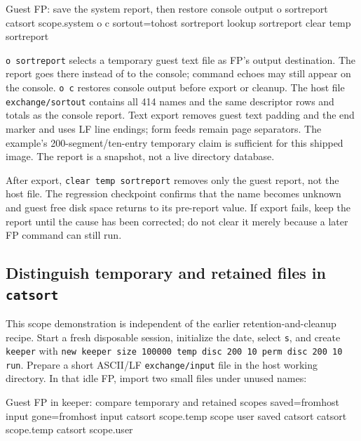 \begin{commandexample}{Guest FP: save the system report, then restore console output}
o sortreport
catsort scope.system
o c
sortout=tohost sortreport
lookup sortreport
clear temp sortreport
\end{commandexample}

\passthrough{\lstinline!o sortreport!} selects a temporary guest text file as FP's output destination. The report goes there instead of to the console; command echoes may still appear on the console. \passthrough{\lstinline!o c!} restores console output before export or cleanup. The host file \passthrough{\lstinline!exchange/sortout!} contains all 414 names and the same descriptor rows and totals as the console report. Text export removes guest text padding and the end marker and uses LF line endings; form feeds remain page separators. The example's 200-segment/ten-entry temporary claim is sufficient for this shipped image. The report is a snapshot, not a live directory database.

After export, \passthrough{\lstinline!clear temp sortreport!} removes only the guest report, not the host file. The regression checkpoint confirms that the name becomes unknown and guest free disk space returns to its pre-report value. If export fails, keep the report until the cause has been corrected; do not clear it merely because a later FP command can still run.

\subsection{\texorpdfstring{Distinguish temporary and retained files in \texttt{catsort}}{Distinguish temporary and retained files in catsort}}\label{distinguish-temporary-and-retained-files-in-catsort}

This scope demonstration is independent of the earlier retention-and-cleanup
recipe. Start a fresh disposable session, initialize the date, select
\texttt{s}, and create \texttt{keeper} with
\texttt{new keeper size 100000 temp disc 200 10 perm disc 200 10 run}.
Prepare a short ASCII/LF \texttt{exchange/input} file in the host working
directory. In that idle FP, import two small files under unused names:

\begin{commandexample}{Guest FP in keeper: compare temporary and retained scopes}
saved=fromhost input
gone=fromhost input
catsort scope.temp
scope user saved
catsort
catsort scope.temp
catsort scope.user
\end{commandexample}

